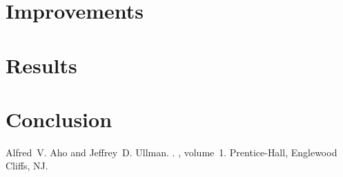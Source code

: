 \documentclass[11pt]{article}
\begin{document}
\section{Improvements}
\label{own}

\section{Results}
\label{results}

\section{Conclusion}

\begin{thebibliography}{}

Alfred~V. Aho and Jeffrey~D. Ullman.
.
, volume~1.
\newblock Prentice-{Hall}, Englewood Cliffs, NJ.


\end{thebibliography}
\end{document}
